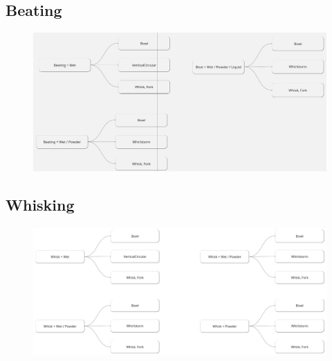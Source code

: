 \subsection*{Beating}
\begin{figure}[H]
\includegraphics[scale=0.3]{Graphics/BeatingDT.jpg}
\end{figure}

\subsection*{Whisking}
\begin{figure}[H]
\includegraphics[scale=0.3]{Graphics/WhiskingDT.jpg}
\end{figure}